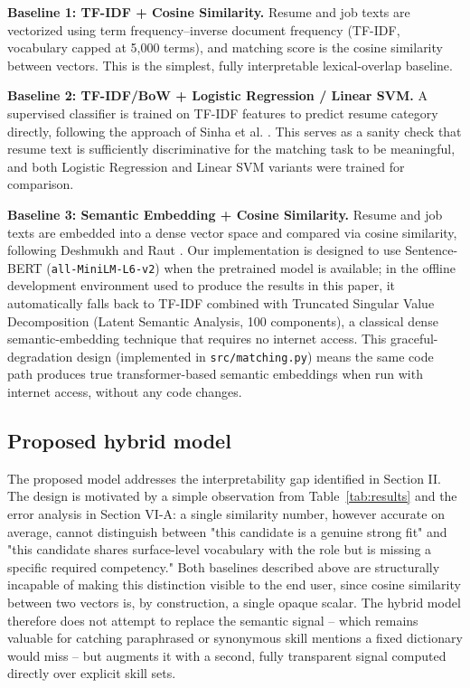 \documentclass[conference]{IEEEtran}
\begin{document}
\textbf{Baseline 1: TF-IDF + Cosine Similarity.} Resume and job texts are vectorized using term frequency--inverse document frequency (TF-IDF, vocabulary capped at 5,000 terms), and matching score is the cosine similarity between vectors. This is the simplest, fully interpretable lexical-overlap baseline.

\textbf{Baseline 2: TF-IDF/BoW + Logistic Regression / Linear SVM.} A supervised classifier is trained on TF-IDF features to predict resume category directly, following the approach of Sinha et al. \cite{sinha2023}. This serves as a sanity check that resume text is sufficiently discriminative for the matching task to be meaningful, and both Logistic Regression and Linear SVM variants were trained for comparison.

\textbf{Baseline 3: Semantic Embedding + Cosine Similarity.} Resume and job texts are embedded into a dense vector space and compared via cosine similarity, following Deshmukh and Raut \cite{deshmukh2024}. Our implementation is designed to use Sentence-BERT (\texttt{all-MiniLM-L6-v2}) when the pretrained model is available; in the offline development environment used to produce the results in this paper, it automatically falls back to TF-IDF combined with Truncated Singular Value Decomposition (Latent Semantic Analysis, 100 components), a classical dense semantic-embedding technique that requires no internet access. This graceful-degradation design (implemented in \texttt{src/matching.py}) means the same code path produces true transformer-based semantic embeddings when run with internet access, without any code changes.

\subsection{Proposed hybrid model}

The proposed model addresses the interpretability gap identified in Section II. The design is motivated by a simple observation from Table~\ref{tab:results} and the error analysis in Section VI-A: a single similarity number, however accurate on average, cannot distinguish between "this candidate is a genuine strong fit" and "this candidate shares surface-level vocabulary with the role but is missing a specific required competency." Both baselines described above are structurally incapable of making this distinction visible to the end user, since cosine similarity between two vectors is, by construction, a single opaque scalar. The hybrid model therefore does not attempt to replace the semantic signal -- which remains valuable for catching paraphrased or synonymous skill mentions a fixed dictionary would miss -- but augments it with a second, fully transparent signal computed directly over explicit skill sets.
\end{document}
